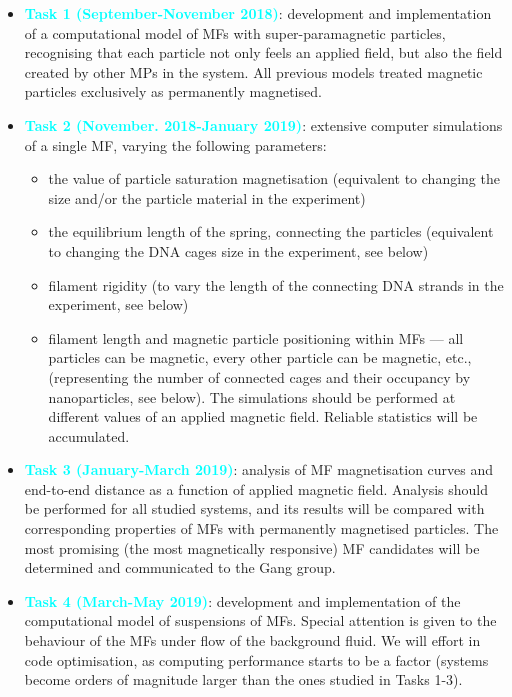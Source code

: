 \documentclass{article}
\begin{document}
\begin{itemize}
    \item{\textbf{\textcolor{cyan}{Task 1 (September-November 2018)}}: development and implementation of a computational model of MFs with super-paramagnetic particles, recognising that each particle not only feels an applied field, but also the field created by other MPs in the system. All previous models treated magnetic particles exclusively as permanently magnetised.}
    \item{\textbf{\textcolor{cyan}{Task 2 (November. 2018-January 2019)}}: extensive computer simulations of a single MF, varying the following parameters: 
    \begin{itemize}
        \item{the value of particle saturation magnetisation (equivalent to changing the size and/or the particle material in the experiment) }
        \item{the equilibrium length of the spring, connecting the particles (equivalent to changing the DNA cages size in the experiment, see below)}
        \item{filament rigidity (to vary the length of the connecting DNA strands in the experiment, see below)}
        \item{filament length and magnetic particle positioning within MFs — all particles can be magnetic, every other particle can be magnetic, etc., (representing the number of connected cages and their occupancy by nanoparticles, see below). The simulations should be performed at different values of an applied magnetic field. Reliable statistics will be accumulated.}
    \end{itemize}
    }
    \item{\textbf{\textcolor{cyan}{Task 3 (January-March 2019)}}: analysis of MF magnetisation curves and end-to-end distance as a function of applied magnetic field. Analysis should be performed for all studied systems, and its results will be compared with corresponding properties of MFs with permanently magnetised particles. The most promising (the most magnetically responsive) MF candidates will be determined and communicated to the Gang group.}
    \item{\textbf{\textcolor{cyan}{Task 4 (March-May 2019)}}: development and implementation of the computational model of suspensions of MFs. Special attention is given to the behaviour of the MFs under flow of the background fluid. We will effort in code optimisation, as computing performance starts to be a factor (systems become orders of magnitude larger than the ones studied in Tasks 1-3). }

\end{itemize}
\end{document}
